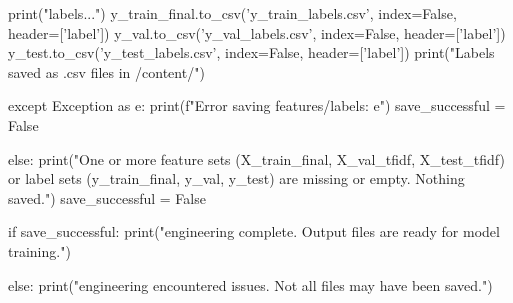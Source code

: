 \begin{ffcode}
        print("\nSaving labels...")
        y_train_final.to_csv('y_train_labels.csv', index=False, header=['label'])
        y_val.to_csv('y_val_labels.csv', index=False, header=['label'])
        y_test.to_csv('y_test_labels.csv', index=False, header=['label'])
        print("Labels saved as .csv files in /content/")

    except Exception as e:
        print(f"Error saving features/labels: {e}")
        save_successful = False

else:
    print("One or more feature sets (X_train_final, X_val_tfidf, X_test_tfidf) or label sets (y_train_final, y_val, y_test) are missing or empty. Nothing saved.")
    save_successful = False

if save_successful:
    print("\nFeature engineering complete. Output files are ready for model training.")

else:
    print("\nFeature engineering encountered issues. Not all files may have been saved.")
\end{ffcode}